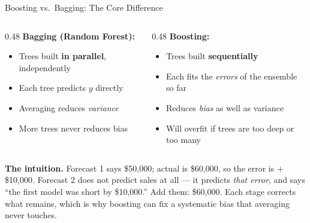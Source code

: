 \documentclass[aspectratio=169, 11pt]{beamer}
\begin{document}
\begin{frame}{Boosting vs.\ Bagging: The Core Difference}
  \begin{columns}[T]
    \begin{column}{0.48\textwidth}
      \textbf{Bagging (Random Forest):}
      \begin{itemize}\small\itemsep0pt
        \item Trees built \textbf{in parallel}, independently
        \item Each tree predicts $y$ directly
        \item Averaging reduces \emph{variance}
        \item More trees never reduces bias
      \end{itemize}
    \end{column}
    \begin{column}{0.48\textwidth}
      \textbf{Boosting:}
      \begin{itemize}\small\itemsep0pt
        \item Trees built \textbf{sequentially}
        \item Each fits the \emph{errors} of the ensemble so far
        \item Reduces \emph{bias} as well as variance
        \item Will overfit if trees are too deep or too many
      \end{itemize}
    \end{column}
  \end{columns}

  \vspace{0.2cm}
  \textbf{The intuition.} Forecast 1 says \$50,000; actual is \$60,000, so the error is
  $+$\$10,000. Forecast 2 does not predict sales at all --- it predicts \emph{that error},
  and says ``the first model was short by \$10,000.'' Add them: \$60,000. Each stage corrects
  what remains, which is why boosting can fix a systematic bias that averaging never touches.
\end{frame}
\end{document}
